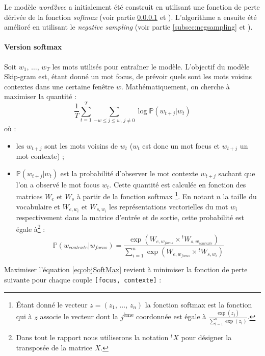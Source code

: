 \documentclass[11pt,french,french]{article}
\let\rmarkdownfootnote\footnote%
\def\footnote{\protect\rmarkdownfootnote}
\begin{document}
Le modèle \emph{word2vec} a initialement été construit en utilisant une fonction de perte dérivée de la fonction \emph{softmax} (voir partie \ref{subsec:softmax} et \cite{Mikolov}). L'algorithme a ensuite été amélioré en utilisant le \emph{negative sampling} (voir partie \ref{subsec:negsampling} et \cite{MikolovNS}).

\hypertarget{subsec:softmax}{%
\paragraph{Version softmax}\label{subsec:softmax}}

Soit \(w_1,\,\dots,\,w_T\) les mots utilisés pour entraîner le modèle. L'objectif du modèle Skip-gram est, étant donné un mot focus, de prévoir quels sont les mots voisins contextes dans une certaine fenêtre \(w\). Mathématiquement, on cherche à maximiser la quantité :
\begin{equation}
\frac 1 T\sum_{t=1}^T\sum_{-w\leq j \leq w,\,j\ne 0} \log \mathbb P(w_{t+j}\vert w_{t})
\label{eq:objSoftMax}
\end{equation}
où :

\begin{itemize}
\item
  les \(w_{t+j}\) sont les mots voisins de \(w_t\) (\(w_t\) est donc un mot focus et \(w_{t+j}\) un mot contexte) ;
\item
  \(\mathbb P(w_{t+j}\vert w_{t})\) est la probabilité d'observer le mot contexte \(w_{t+j}\) sachant que l'on a observé le mot focus \(w_t\).
  Cette quantité est calculée en fonction des matrices \(W_e\) et \(W_s\) à partir de la fonction softmax
  \footnote{Étant donné le vecteur \(z=(z_1,\,\dots,\,z_n)\) la fonction softmax est la fonction qui à \(z\) associe le vecteur dont la \(j\)\textsuperscript{ème} coordonnée est égale à \(\frac{\exp(z_j)}{\sum_{i=1}^n\exp(z_i)}\).}.
  En notant \(n\) la taille du vocabulaire et \(W_{e,w_i}\) et \(W_{s,w_i}\) les représentations vectorielles du mot \(w_i\) respectivement dans la matrice d'entrée et de sortie, cette probabilité est égale à\footnote{Dans tout le rapport nous utiliserons la notation \(^{t}X\) pour désigner la transposée de la matrice \(X\).} :
  \[
  \mathbb P(w_{contexte}\vert w_{focus}) = 
  \frac{
  \exp(W_{e,w_{focus}}\times {}^tW_{s,w_{contexte}})
  }{
  \sum_{i=1}^n\exp(W_{e,w_{focus}}\times {}^tW_{s,w_{i}})
  }
  \]
\end{itemize}

Maximiser l'équation \eqref{eq:objSoftMax} revient à minimiser la fonction de perte suivante pour chaque couple \texttt{{[}focus,\ contexte{]}} :
\end{document}
